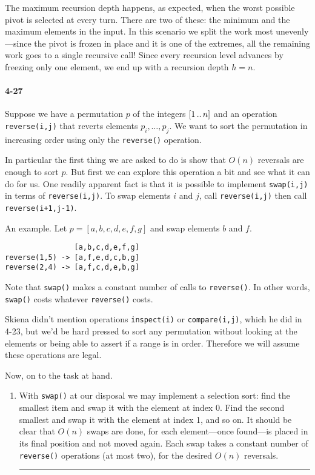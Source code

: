 \documentclass{report}
\newcommand{\underconstruction}{\marginpar{\bcpanchant}}
\newcommand{\li}{\lstinline}
\newcommand{\ldotsTwo}{%
 \mathinner{{\ldotp}{\ldotp}}%
}
\newcommand{\okthen}{\rule[-1.4pt]{0.3em}{0.77em}}
\begin{document}
The maximum recursion depth happens, as expected, when the worst possible pivot is selected at every turn. There are two of these: the minimum and the maximum elements in the input. In this scenario we split the work most unevenly---since the pivot is frozen in place and it is one of the extremes, all the remaining work goes to a single recursive call! Since every recursion level advances by freezing only one element, we end up with a recursion depth $h=n$.

\paragraph{4-27} Suppose we have a permutation $p$ of the integers $[1\ldotsTwo n]$ and an operation \li!reverse(i,j)! that reverts elements $p_i,\ldots,p_j$. We want to sort the permutation in increasing order using only the \li!reverse()! operation.

In particular the first thing we are asked to do is show that $O(n)$ reversals are enough to sort $p$. But first we can explore this operation a bit and see what it can do for us. One readily apparent fact is that it is possible to implement \li!swap(i,j)! in terms of \li!reverse(i,j)!. To swap elements $i$ and $j$, call \li!reverse(i,j)! then call \li!reverse(i+1,j-1)!.

An example. Let $p=[a,b,c,d,e,f,g]$ and swap elements $b$ and $f$.
\begin{lstlisting}
                [a,b,c,d,e,f,g]
reverse(1,5) -> [a,f,e,d,c,b,g]
reverse(2,4) -> [a,f,c,d,e,b,g]
\end{lstlisting}

Note that \li!swap()! makes a constant number of calls to \li!reverse()!. In other words, \li!swap()! costs whatever \li!reverse()! costs.

\smallskip

Skiena didn't mention operations \li!inspect(i)! or \li!compare(i,j)!, which he did in 4-23, but we'd be hard pressed to sort any permutation without looking at the elements or being able to assert if a range is in order. Therefore we will assume these operations are legal.

\smallskip

Now, on to the task at hand.
\begin{enumerate}[label=(\alph*)]
\item With \li!swap()! at our disposal we may implement a selection sort: find the smallest item and swap it with the element at index 0. Find the second smallest and swap it with the element at index 1, and so on. It should be clear that $O(n)$ swaps are done, for each element---once found---is placed in its final position and not moved again. Each swap takes a constant number of \li!reverse()! operations (at most two), for the desired $O(n)$ reversals.\ \okthen
\underconstruction
\end{enumerate}
\end{document}
